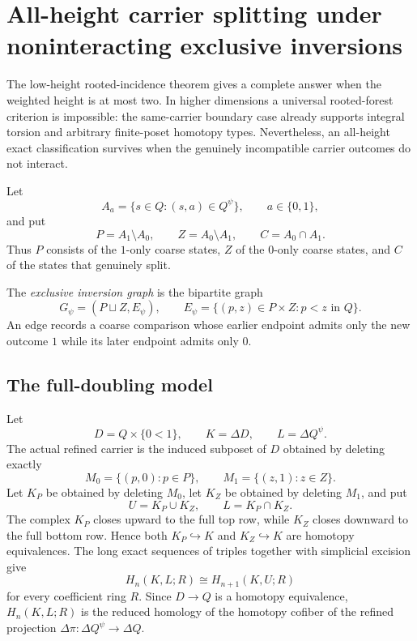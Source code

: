 
\section{All-height carrier splitting under noninteracting exclusive inversions}
\label{sec:exclusive-matching}

The low-height rooted-incidence theorem gives a complete answer when the
weighted height is at most two.  In higher dimensions a universal rooted-forest
criterion is impossible: the same-carrier boundary case already supports
integral torsion and arbitrary finite-poset homotopy types.  Nevertheless, an
all-height exact classification survives when the genuinely incompatible
carrier outcomes do not interact.

Let
\[
A_a=\{s\in Q:(s,a)\in Q^\psi\},\qquad a\in\{0,1\},
\]
and put
\[
P=A_1\setminus A_0,\qquad Z=A_0\setminus A_1,\qquad
C=A_0\cap A_1.
\]
Thus $P$ consists of the $1$-only coarse states, $Z$ of the $0$-only coarse
states, and $C$ of the states that genuinely split.

\begin{definition}
\label{def:exclusive-inversion-graph}
The \emph{exclusive inversion graph} is the bipartite graph
\[
G_\psi=(P\sqcup Z,E_\psi),\qquad
E_\psi=\{(p,z)\in P\times Z:p<z\text{ in }Q\}.
\]
An edge records a coarse comparison whose earlier endpoint admits only the new
outcome $1$ while its later endpoint admits only $0$.
\end{definition}

\subsection{The full-doubling model}

Let
\[
D=Q\times\{0<1\},\qquad K=\Delta D,\qquad L=\Delta Q^\psi.
\]
The actual refined carrier is the induced subposet of $D$ obtained by deleting
exactly
\[
M_0=\{(p,0):p\in P\},\qquad
M_1=\{(z,1):z\in Z\}.
\]
Let $K_P$ be obtained by deleting $M_0$, let $K_Z$ be obtained by deleting
$M_1$, and put
\[
U=K_P\cup K_Z,\qquad L=K_P\cap K_Z.
\]
The complex $K_P$ closes upward to the full top row, while $K_Z$ closes
downward to the full bottom row.  Hence both $K_P\hookrightarrow K$ and
$K_Z\hookrightarrow K$ are homotopy equivalences.  The long exact sequences
of triples together with simplicial excision give
\begin{equation}
H_n(K,L;R)\cong H_{n+1}(K,U;R)
\label{eq:two-colour-shift}
\end{equation}
for every coefficient ring $R$.  Since $D\to Q$ is a homotopy equivalence,
$H_n(K,L;R)$ is the reduced homology of the homotopy cofiber of the refined
projection $\Delta\pi:\Delta Q^\psi\to\Delta Q$.

